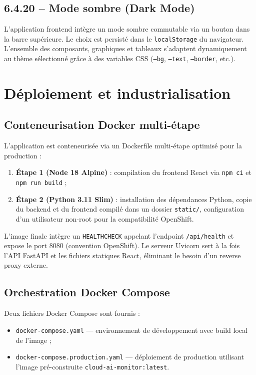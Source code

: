 \documentclass[11pt,a4paper]{report}
\begin{document}
\subsection*{6.4.20 -- Mode sombre (Dark Mode)}

L'application frontend intègre un mode sombre commutable via un bouton dans
la barre supérieure. Le choix est persisté dans le \texttt{localStorage} du
navigateur. L'ensemble des composants, graphiques et tableaux s'adaptent
dynamiquement au thème sélectionné grâce à des variables CSS
(\texttt{--bg}, \texttt{--text}, \texttt{--border}, etc.).

\section{Déploiement et industrialisation}

\subsection{Conteneurisation Docker multi-étape}

L'application est conteneurisée via un Dockerfile multi-étape optimisé pour
la production :

\begin{enumerate}[leftmargin=1.5cm, labelsep=0.3cm, itemsep=0.2em]
    \item \textbf{Étape 1 (Node 18 Alpine)} : compilation du frontend React
    via \texttt{npm ci} et \texttt{npm run build} ;
    \item \textbf{Étape 2 (Python 3.11 Slim)} : installation des dépendances
    Python, copie du backend et du frontend compilé dans un dossier
    \texttt{static/}, configuration d'un utilisateur non-root pour la
    compatibilité OpenShift.
\end{enumerate}

L'image finale intègre un \texttt{HEALTHCHECK} appelant l'endpoint
\texttt{/api/health} et expose le port 8080 (convention OpenShift). Le
serveur Uvicorn sert à la fois l'API FastAPI et les fichiers statiques React,
éliminant le besoin d'un reverse proxy externe.

\subsection{Orchestration Docker Compose}

Deux fichiers Docker Compose sont fournis :

\begin{itemize}[label=\textbullet, leftmargin=1.5cm, labelsep=0.5cm,
                itemsep=0.1em, parsep=0em, topsep=0.2em]
    \item \texttt{docker-compose.yaml} — environnement de développement
    avec build local de l'image ;
    \item \texttt{docker-compose.production.yaml} — déploiement de production
    utilisant l'image pré-construite \texttt{cloud-ai-monitor:latest}.
\end{itemize}
\end{document}
